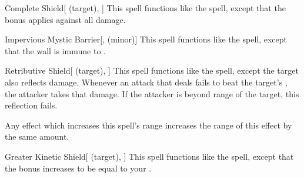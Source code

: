 \lowercase{\hypertarget{spell:Complete Shield}{}}\label{spell:Complete Shield}
\begin{attuneability}[\nth{5}]{\hypertarget{spell:Complete Shield}{Complete Shield}}[ (target), ]
This spell functions like the  spell, except that the bonus applies against all damage.
\end{attuneability}
\vspace{0.25em}



\lowercase{\hypertarget{spell:Impervious Mystic Barrier}{}}\label{spell:Impervious Mystic Barrier}
\begin{freeability}[\nth{5}]{\hypertarget{spell:Impervious Mystic Barrier}{Impervious Mystic Barrier}}[,  (minor)]
\targetrule
This spell functions like the  spell, except that the wall is immune to .
\end{freeability}
\vspace{0.25em}



\lowercase{\hypertarget{spell:Retributive Shield}{}}\label{spell:Retributive Shield}
\begin{attuneability}[\nth{5}]{\hypertarget{spell:Retributive Shield}{Retributive Shield}}[ (target), ]
This spell functions like the  spell, except the target also reflects damage.
Whenever an attack that deals  fails to beat the target's , the attacker takes that damage.
If the attacker is beyond \rngclose range of the target, this reflection fails.

Any effect which increases this spell's range increases the range of this effect by the same amount.
\end{attuneability}
\vspace{0.25em}



\lowercase{\hypertarget{spell:Greater Kinetic Shield}{}}\label{spell:Greater Kinetic Shield}
\begin{attuneability}[\nth{6}]{\hypertarget{spell:Greater Kinetic Shield}{Greater Kinetic Shield}}[ (target), ]
This spell functions like the  spell, except that the bonus increases to be equal to your .
\end{attuneability}
\vspace{0.25em}



